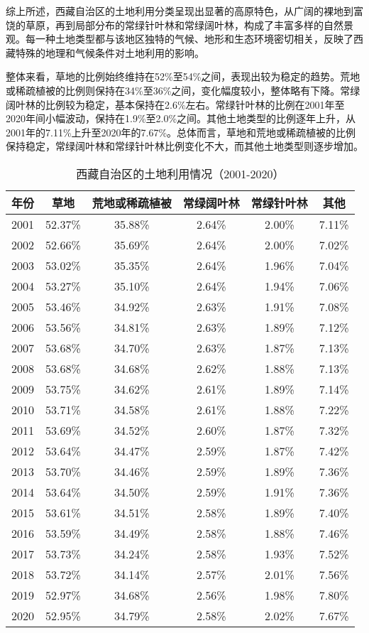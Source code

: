 \documentclass{article}
\begin{document}
		综上所述，西藏自治区的土地利用分类呈现出显著的高原特色，从广阔的裸地到富饶的草原，再到局部分布的常绿针叶林和常绿阔叶林，构成了丰富多样的自然景观。每一种土地类型都与该地区独特的气候、地形和生态环境密切相关，反映了西藏特殊的地理和气候条件对土地利用的影响。
		
		
		整体来看，草地的比例始终维持在52\%至54\%之间，表现出较为稳定的趋势。荒地或稀疏植被的比例则保持在34\%至36\%之间，变化幅度较小，整体略有下降。常绿阔叶林的比例较为稳定，基本保持在2.6\%左右。常绿针叶林的比例在2001年至2020年间小幅波动，保持在1.9\%至2.0\%之间。其他土地类型的比例逐年上升，从2001年的7.11\%上升至2020年的7.67\%。总体而言，草地和荒地或稀疏植被的比例保持稳定，常绿阔叶林和常绿针叶林比例变化不大，而其他土地类型则逐步增加。
		
		
		\begin{table}[H]
			\centering
			\begin{tabular}{|c|c|c|c|c|c|}
				\hline
				年份 & 草地 & 荒地或稀疏植被 & 常绿阔叶林 & 常绿针叶林 & 其他 \\
				\hline
				2001 & 52.37\% & 35.88\% & 2.64\% & 2.00\% & 7.11\% \\
				2002 & 52.66\% & 35.69\% & 2.64\% & 2.00\% & 7.02\% \\
				2003 & 53.02\% & 35.35\% & 2.64\% & 1.96\% & 7.04\% \\
				2004 & 53.27\% & 35.10\% & 2.64\% & 1.94\% & 7.06\% \\
				2005 & 53.46\% & 34.92\% & 2.63\% & 1.91\% & 7.08\% \\
				2006 & 53.56\% & 34.81\% & 2.63\% & 1.89\% & 7.12\% \\
				2007 & 53.68\% & 34.70\% & 2.63\% & 1.87\% & 7.13\% \\
				2008 & 53.68\% & 34.68\% & 2.62\% & 1.88\% & 7.13\% \\
				2009 & 53.75\% & 34.62\% & 2.61\% & 1.89\% & 7.14\% \\
				2010 & 53.71\% & 34.58\% & 2.61\% & 1.88\% & 7.22\% \\
				2011 & 53.69\% & 34.52\% & 2.60\% & 1.87\% & 7.32\% \\
				2012 & 53.64\% & 34.47\% & 2.59\% & 1.87\% & 7.42\% \\
				2013 & 53.70\% & 34.46\% & 2.59\% & 1.89\% & 7.36\% \\
				2014 & 53.64\% & 34.50\% & 2.59\% & 1.91\% & 7.36\% \\
				2015 & 53.61\% & 34.51\% & 2.58\% & 1.89\% & 7.40\% \\
				2016 & 53.59\% & 34.49\% & 2.58\% & 1.88\% & 7.46\% \\
				2017 & 53.73\% & 34.24\% & 2.58\% & 1.93\% & 7.52\% \\
				2018 & 53.72\% & 34.14\% & 2.57\% & 2.01\% & 7.56\% \\
				2019 & 52.97\% & 34.68\% & 2.56\% & 1.98\% & 7.80\% \\
				2020 & 52.95\% & 34.79\% & 2.58\% & 2.02\% & 7.67\% \\
				\hline
			\end{tabular}
			\caption{西藏自治区的土地利用情况（2001-2020）}
		\end{table}
		
\end{document}
